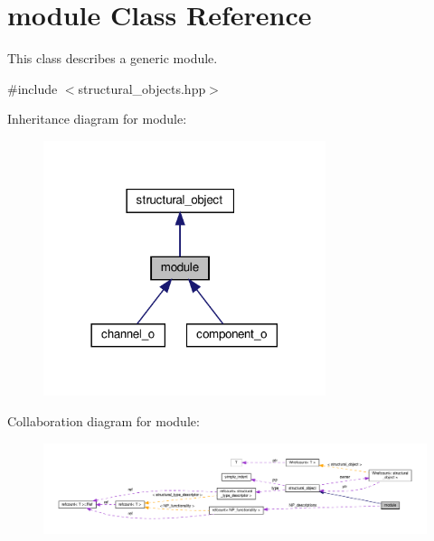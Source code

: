 \hypertarget{classmodule}{}\section{module Class Reference}
\label{classmodule}


This class describes a generic module.  




{\ttfamily \#include $<$structural\+\_\+objects.\+hpp$>$}



Inheritance diagram for module\+:
\nopagebreak
\begin{figure}[H]
\begin{center}
\leavevmode
\includegraphics[width=234pt]{da/dcb/classmodule__inherit__graph}
\end{center}
\end{figure}


Collaboration diagram for module\+:
\nopagebreak
\begin{figure}[H]
\begin{center}
\leavevmode
\includegraphics[width=350pt]{d8/db1/classmodule__coll__graph}
\end{center}
\end{figure}
